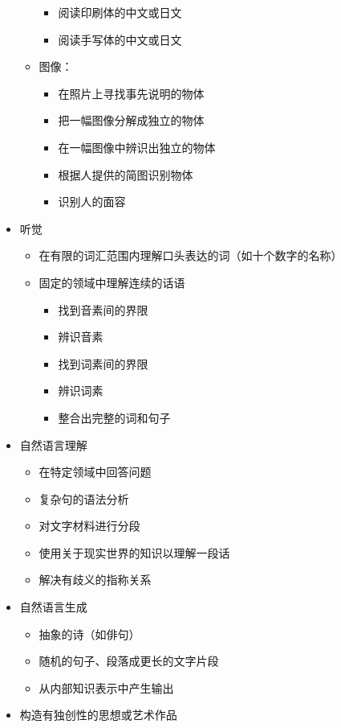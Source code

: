 \begin{itemize}
\begin{itemize}
\begin{itemize}
    \item 阅读印刷体的中文或日文
    \item 阅读手写体的中文或日文
    \end{itemize}
  \item 图像：
    \begin{itemize}
    \item 在照片上寻找事先说明的物体
    \item 把一幅图像分解成独立的物体
    \item 在一幅图像中辨识出独立的物体
    \item 根据人提供的简图识别物体
    \item 识别人的面容
    \end{itemize}
  \end{itemize}
\item 听觉
  \begin{itemize}
  \item 在有限的词汇范围内理解口头表达的词（如十个数字的名称）
  \item 固定的领域中理解连续的话语
    \begin{itemize}
    \item 找到音素间的界限
    \item 辨识音素
    \item 找到词素间的界限
    \item 辨识词素
    \item 整合出完整的词和句子
    \end{itemize}
  \end{itemize}
\item 自然语言理解
  \begin{itemize}
  \item 在特定领域中回答问题
  \item 复杂句的语法分析
  \item 对文字材料进行分段
  \item 使用关于现实世界的知识以理解一段话
  \item 解决有歧义的指称关系
  \end{itemize}
\item 自然语言生成
  \begin{itemize}
  \item 抽象的诗（如俳句）
  \item 随机的句子、段落成更长的文字片段
  \item 从内部知识表示中产生输出
  \end{itemize}
\item 构造有独创性的思想或艺术作品
  \begin{itemize}

\end{itemize}
\end{itemize}
